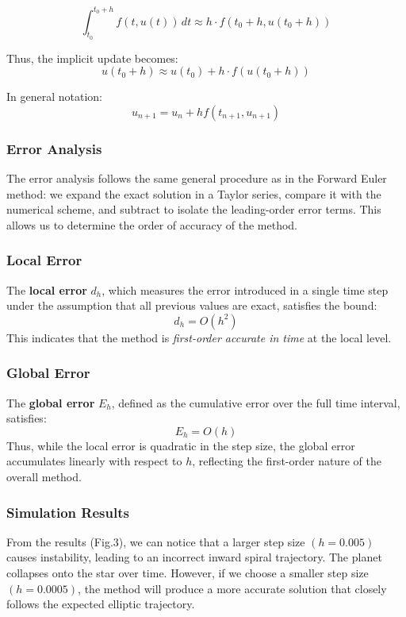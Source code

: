 \documentclass[11pt]{article}
\begin{document}
\[
\int_{t_0}^{t_0 + h} f(t, u(t)) \, dt \approx h \cdot f(t_0 + h, u(t_0 + h))
\]

Thus, the implicit update becomes:
\[
u(t_0 + h) \approx u(t_0) + h \cdot f(u(t_0 + h))
\]

In general notation:
\[
u_{n+1} = u_n + h f(t_{n+1},u_{n+1})
\]



\subsubsection{Error Analysis}

The error analysis follows the same general procedure as in the Forward Euler method: we expand the exact solution in a Taylor series, compare it with the numerical scheme, and subtract to isolate the leading-order error terms. This allows us to determine the order of accuracy of the method.

\subsubsection*{Local Error}

The \textbf{local error} \( d_h \), which measures the error introduced in a single time step under the assumption that all previous values are exact, satisfies the bound:
\[
d_h = O(h^2)
\]
This indicates that the method is \emph{first-order accurate in time} at the local level.

\subsubsection*{Global Error}

The \textbf{global error} \( E_h \), defined as the cumulative error over the full time interval, satisfies:
\[
E_h = O(h)
\]
Thus, while the local error is quadratic in the step size, the global error accumulates linearly with respect to \( h \), reflecting the first-order nature of the overall method.




\subsubsection{Simulation Results}
From the results (Fig.3), we can notice that a larger step size $(h = 0.005)$ causes instability, leading to an incorrect inward spiral trajectory. The planet collapses onto the star over time. However, if we choose a smaller step size $(h = 0.0005)$, the method will produce a more accurate solution that closely follows the expected elliptic trajectory.
\end{document}
